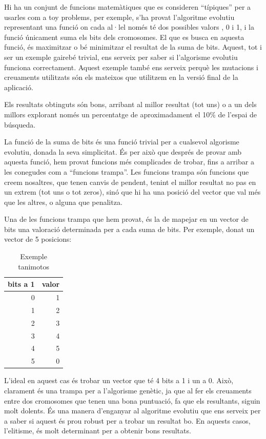 \documentclass[titlepage,a4paper,12pt]{book}
\begin{document}
Hi ha un conjunt de funcions matemàtiques que es consideren ``típiques'' per a
usarles com a toy problems, per exemple, s'ha provat l'algoritme evolutiu
representant una funció on cada al·lel només té dos possibles valors , 0 i 1, i
la funció únicament suma els bits dels cromosomes.  El que es busca en aquesta
funció, és maximitzar o bé minimitzar el resultat de la suma de bits.  Aquest,
tot i ser un exemple gairebé trivial, ens serveix per saber si l'algorisme
evolutiu funciona correctament.  Aquest exemple també ens serveix perquè les
mutacions i creuaments utilitzats són els mateixos que utilitzem en la versió
final de la aplicació.

Els resultats obtinguts són bons, arribant al millor resultat (tot uns) o a un
dels millors explorant només un percentatge de aproximadament el  10\% de
l'espai de búsqueda.

La funció de la suma de bits és una funció trivial per a cualsevol algorisme
evolutiu, donada la seva simplicitat.  És per això que després de provar amb
aquesta funció, hem provat funcions més complicades de trobar, fins a arribar a
les conegudes com a ``funcions trampa''.  Les funcions trampa són funcions que
creem nosaltres, que tenen canvis de pendent, tenint el millor resultat no pas
en un extrem (tot uns o tot zeros), sinó que hi ha una posició del vector que
val més que les altres, o alguna que penalitza.

Una de les funcions trampa que hem provat, és la de mapejar en un vector de bits
una valoració determinada per a cada suma de bits.  Per exemple, donat un vector
de 5 posicions:



\begin{table}
\centering
\caption{Exemple tanimotos}
\begin{tabular}{|r|r|}
\hline
\multicolumn{1}{|c|}{\textbf{bits a 1 }} & \multicolumn{1}{c|}{\textbf{ valor}} \\
\hline
\hline
0 & 1 \\
1 & 2 \\
2 & 3 \\
3 & 4 \\
4 & 5 \\
5 & 0 \\
\hline
\end{tabular}
\end{table}


L'ideal en aquest cas és trobar un vector que té 4 bits a 1 i un a 0.  Això,
clarament és una trampa per a l'algorisme genètic, ja que al fer els creuaments
entre dos cromosomes que tenen una bona puntuació, fa que els resultants, siguin
molt dolents. És una manera d'enganyar al algoritme evolutiu que ens serveix per
a saber si aquest és prou robust per a trobar un resultat bo.  En aquests casos,
l'elitisme, és molt determinant per a obtenir bons resultats.
\end{document}
